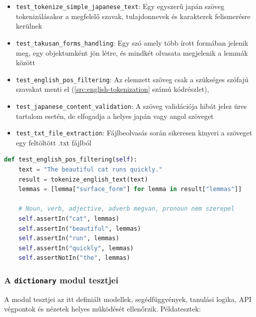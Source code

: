 \begin{itemize}
  \item \texttt{test\_tokenize\_simple\_japanese\_text}: Egy egyszerű japán szöveg tokenizálásakor a megfelelő szavak, tulajdonnevek és karakterek felismerésre kerülnek
  \item \texttt{test\_takusan\_forms\_handling}: Egy szó amely több írott formában jelenik meg, egy objektumként jön létre, és mindkét olvasata megjelenik a lemmák között
  \item \texttt{test\_english\_pos\_filtering}: Az elemzett szöveg csak a szükséges szófajú szavakat menti el (\ref{src:english-tokenization} számú kódrészlet),
  \item \texttt{test\_japanese\_content\_validation}: A szöveg validációja hibát jelez üres tartalom esetén, de elfogadja a helyes japán vagy angol szöveget
  \item \texttt{test\_txt\_file\_extraction}: Fájlbeolvasás során sikeresen kinyeri a szöveget egy feltöltött .txt fájlból
\end{itemize}
  
\begin{lstlisting}[language=Python]
def test_english_pos_filtering(self):
    text = "The beautiful cat runs quickly."
    result = tokenize_english_text(text)
    lemmas = [lemma["surface_form"] for lemma in result["lemmas"]]
    
    # Noun, verb, adjective, adverb megvan, pronoun nem szerepel
    self.assertIn("cat", lemmas)
    self.assertIn("beautiful", lemmas)
    self.assertIn("run", lemmas)
    self.assertIn("quickly", lemmas)
    self.assertNotIn("the", lemmas)
\end{lstlisting}

\subsubsection{A \texttt{dictionary} modul tesztjei}

A modul tesztjei az itt definiált modellek, segédfüggvények, tanulási logika, API végpontok és nézetek helyes működését ellenőrzik. Példatesztek:

